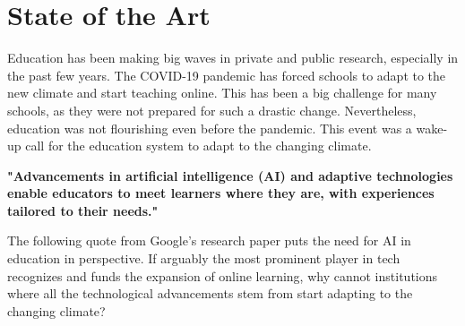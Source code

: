 \chapter{State of the Art}
\label{ch:stateoftheart}


Education has been making big waves in private and public research, especially in the past few years. The COVID-19 pandemic has forced schools to adapt to the new climate and start teaching online. This has been a big challenge for many schools, as they were not prepared for such a drastic change. Nevertheless, education was not flourishing even before the pandemic. This event was a wake-up call for the education system to adapt to the changing climate.

\textbf{"Advancements in artificial intelligence (AI) and adaptive technologies enable educators to meet learners where they are, with experiences tailored to their needs."}\cite{google:aiineducation}

The following quote from Google's research paper puts the need for AI in education in perspective. If arguably the most prominent player in tech recognizes and funds the expansion of online learning, why cannot institutions where all the technological advancements stem from start adapting to the changing climate?

